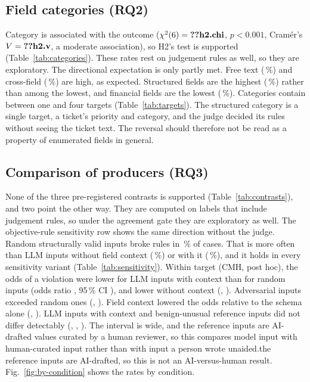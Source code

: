 \documentclass[conference]{IEEEtran}
\begin{document}

\subsection{Field categories (RQ2)}

Category is associated with the outcome ($\chi^2(6)=\R{h2.chi}$, $p<0.001$, Cram\'er's
$V=\R{h2.v}$, a moderate association), so H2's test is supported
(Table~\ref{tab:categories}).\ifjudgeweak{} These rates rest on judgement rules as well, so they are
exploratory.\fi{} The directional expectation is only partly met. Free text (\,\%) and
cross-field (\,\%) are high, as expected. Structured fields are the highest
(\,\%) rather than among the lowest, and financial fields are the lowest
(\,\%). Categories contain between one and four targets (Table~\ref{tab:targets}). The
structured category is a single target, a ticket's priority and category, and the judge decided its
rules without seeing the ticket text. The reversal should therefore not be read as a property of
enumerated fields in general.

\subsection{Comparison of producers (RQ3)}

None of the three pre-registered contrasts is supported (Table~\ref{tab:contrasts}), and two point the
other way.\ifjudgeweak{} They are computed on labels that include judgement rules, so under the
agreement gate they are exploratory as well. The objective-rule sensitivity row shows the same
direction without the judge.\fi{} Random structurally valid inputs broke rules in \,\% of
cases. That is more often than LLM inputs without field context (\,\%) or with it
(\,\%), and it holds in every sensitivity variant (Table~\ref{tab:sensitivity}). Within
target (CMH, post hoc), the odds of a violation were lower for LLM inputs with context than for random
inputs (odds ratio , 95\,\% CI ), and lower without context
(, ). Adversarial inputs exceeded random ones (,
). Field context lowered the odds relative to the schema alone (,
). LLM inputs with context and benign-unusual reference inputs did not differ detectably
(, , ). The interval is wide, and \ifreviewed the reference
inputs are AI-drafted values curated by a human reviewer, so this compares model input with
human-curated input rather than with input a person wrote unaided.\else the reference inputs are
AI-drafted, so this is not an AI-versus-human result.\fi{} Fig.~\ref{fig:by-condition} shows the rates
by condition.
\end{document}
